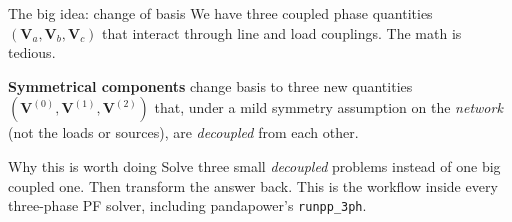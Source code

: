 \documentclass[aspectratio=169,10pt]{beamer}
\newcommand{\code}[1]{\texttt{#1}}
\begin{document}
\begin{frame}{The big idea: change of basis}
We have three coupled phase quantities $(\mathbf{V}_a, \mathbf{V}_b, \mathbf{V}_c)$ that interact through line and load couplings. The math is tedious.
\vspace{0.4em}

\textbf{Symmetrical components} change basis to three new quantities $(\mathbf{V}^{(0)}, \mathbf{V}^{(1)}, \mathbf{V}^{(2)})$ that, under a mild symmetry assumption on the \emph{network} (not the loads or sources), are \emph{decoupled} from each other.
\vspace{0.4em}

\centering
{}
\vspace{0.4em}
\begin{block}{Why this is worth doing}
Solve three small \emph{decoupled} problems instead of one big coupled one. Then transform the answer back. This is the workflow inside every three-phase PF solver, including pandapower's \code{runpp\_3ph}.
\end{block}
\end{frame}
\end{document}
